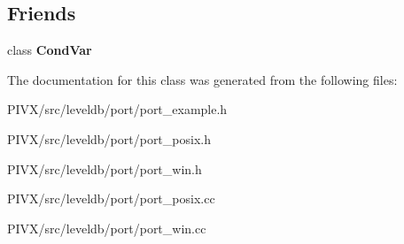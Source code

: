 \subsection*{Friends}
\begin{DoxyCompactItemize}
\item 
\mbox{\label{classleveldb_1_1port_1_1_mutex_a4c7086cb9e92b300d6d5c1eac180e075}} 
class {\bfseries Cond\+Var}
\end{DoxyCompactItemize}


The documentation for this class was generated from the following files\+:\begin{DoxyCompactItemize}
\item 
P\+I\+V\+X/src/leveldb/port/port\+\_\+example.\+h\item 
P\+I\+V\+X/src/leveldb/port/port\+\_\+posix.\+h\item 
P\+I\+V\+X/src/leveldb/port/port\+\_\+win.\+h\item 
P\+I\+V\+X/src/leveldb/port/port\+\_\+posix.\+cc\item 
P\+I\+V\+X/src/leveldb/port/port\+\_\+win.\+cc\end{DoxyCompactItemize}
